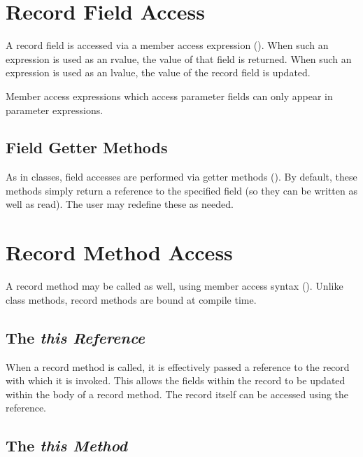 \section{Record Field Access}
\label{Record_Field_Access}

A record field is accessed via a member access expression
().  When such an expression is used as an
rvalue, the value of that field is returned.  When such an expression is used as
an lvalue, the value of the record field is updated.

Member access expressions which access parameter fields can only appear in
parameter expressions.

\subsection{Field Getter Methods}
\label{Field_Getter_Methods}

As in classes, field accesses are performed via getter methods
().  By default, these methods simply return a reference to
the specified field (so they can be written as well as read).  The user may
redefine these as needed.

\section{Record Method Access}
\label{Record_Method_Access}

A record method may be called as well, using member access syntax
().  Unlike class methods, record methods are
bound at compile time.  

\subsection{The \em{this} Reference}
\label{The_this_Reference}
\index{this@\chpl[this}

When a record method is called, it is effectively passed a reference to the
record with which it is invoked.  This allows the fields within the record to be
updated within the body of a record method.  The record itself can be accessed
using the  reference.

\subsection{The \em{this} Method}

